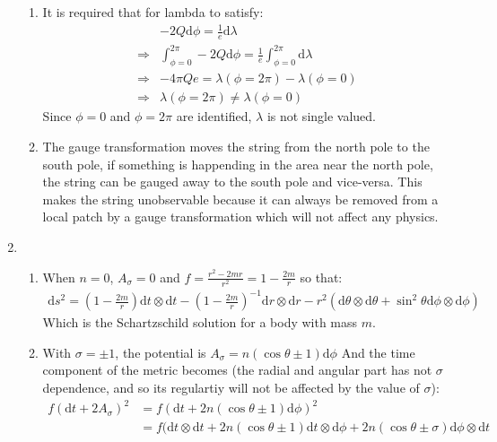 \documentclass[12pt,a4]{article}
\newcommand{\e}{\mathrm{d}}
\begin{document}
\begin{enumerate}
\begin{enumerate}
      \item
        It is required that for lambda to satisfy:
        \begin{align*}
                      & - 2 Q \e \phi = \frac{1}{e} \e \lambda\\
          \Rightarrow & \int_{\phi = 0}^{2 \pi} - 2 Q \e \phi = \frac{1}{e} \int_{\phi = 0}^{2 \pi} \e \lambda\\
          \Rightarrow &  - 4 \pi Q e  =  \lambda(\phi = 2 \pi) - \lambda(\phi = 0)\\
          \Rightarrow &  \lambda(\phi = 2 \pi) \neq \lambda(\phi = 0)
        \end{align*}
        Since $\phi = 0$ and $\phi = 2 \pi$ are identified, $\lambda$ is not single valued.
      \item
        The gauge transformation moves the string from the north pole to the south pole, if something is happending in the area near the north pole, the string can be gauged away to the south pole and vice-versa.
        This makes the string unobservable because it can always be removed from a local patch by a gauge transformation which will not affect any physics.
    \end{enumerate}
  \item
    \begin{enumerate}
      \item
        When $n = 0$, $A_\sigma = 0$ and $f = \frac{r^2 - 2 m r}{r^2} = 1 - \frac{2 m}{r}$ so that:
        \begin{align*}
          \e s^2 = \left(1 - \frac{2 m}{r}\right)\e t \otimes \e t - \left(1 - \frac{2 m}{r}\right)^{-1}\e r \otimes \e r - r^2 (\e \theta \otimes \e \theta + \sin^2 \theta \e \phi \otimes \e \phi)
        \end{align*}
        Which is the Schartzschild solution for a body with mass $m$.
      \item
        With $\sigma = \pm 1$, the potential is $A_\sigma = n(\cos \theta \pm 1) \e \phi$
        And the time component of the metric becomes (the radial and angular part has not $\sigma$ dependence, and so its regulartiy will not be affected by the value of 
        $\sigma$):
        \begin{align*}
          f(\e t + 2 A_\sigma)^2 &= f(\e t + 2 n (\cos\theta \pm 1) \e \phi)^2\\
                                 &= f(\e t \otimes \e t + 2 n (\cos\theta \pm 1) \e t \otimes \e \phi + 2 n (\cos\theta \pm \sigma) \e \phi \otimes \e t\\

\end{align*}
\end{enumerate}
\end{enumerate}
\end{document}
